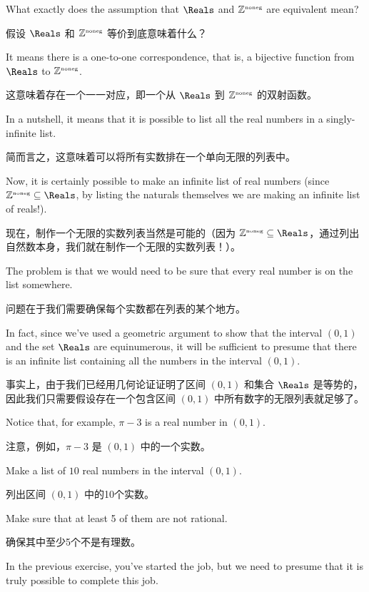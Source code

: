 What exactly does the assumption that $\Reals$ and ${\mathbb Z}^{\mbox{\tiny noneg}}$ are
equivalent mean?

假设 $\Reals$ 和 ${\mathbb Z}^{\mbox{\tiny noneg}}$ 等价到底意味着什么？

It means there is a one-to-one correspondence, that is, a bijective function
from $\Reals$ to ${\mathbb Z}^{\mbox{\tiny noneg}}$.

这意味着存在一个一一对应，即一个从 $\Reals$ 到 ${\mathbb Z}^{\mbox{\tiny noneg}}$ 的双射函数。

In a nutshell, it means that it is
possible to list all the real
numbers in a singly-infinite list.

简而言之，这意味着可以将所有实数排在一个单向无限的列表中。

Now, it is certainly possible to make an
infinite list of real numbers (since $\Naturals \subseteq \Reals$,
by listing the naturals themselves
we are making an infinite list of reals!).

现在，制作一个无限的实数列表当然是可能的（因为 $\Naturals \subseteq \Reals$，通过列出自然数本身，我们就在制作一个无限的实数列表！）。

The problem is that we would need
to be sure that every real number is on the list somewhere.

问题在于我们需要确保每个实数都在列表的某个地方。

In fact, since
we've used a geometric argument to show that the interval $(0, 1)$ and the
set $\Reals$ are equinumerous, it will be sufficient to presume that there
is an infinite list containing all the numbers in the interval $(0, 1)$.

事实上，由于我们已经用几何论证证明了区间 $(0, 1)$ 和集合 $\Reals$ 是等势的，因此我们只需要假设存在一个包含区间 $(0, 1)$ 中所有数字的无限列表就足够了。

\begin{exer}  Notice that, for example,  $\pi-3$ is a real number in
$(0, 1)$.

注意，例如，$\pi-3$ 是 $(0, 1)$ 中的一个实数。

    Make
    a list of $10$ real numbers in the interval $(0, 1)$.

    列出区间 $(0, 1)$ 中的10个实数。

    Make sure that
    at least 5 of them are not rational.

    确保其中至少5个不是有理数。

\end{exer}

In the previous exercise, you've started the job, but we need to presume
that it is truly possible to complete this job.

